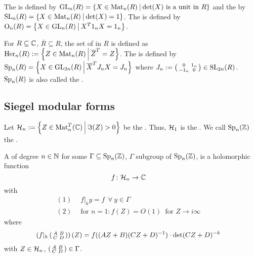 The  is defined by $\GL_n(R) = \Set{X \in \M_n(R)}{\text{$\det(X)$ is a unit in $R$}}$
and the  by $\SL_n(R) = \Set{X \in \M_n(R)}{\det(X) = 1}$. %
The  is defined by $\Orth_n(R) = \Set{X \in \GL_n(R)}{X^T 1_n X = 1_n}$. %

For $R \subseteq \mathbb{C}$, $\overline{R} \subseteq R$, the set of  in $R$ is defined as $\Her_n(R) := \Set{Z \in \M_n(R)}{\overline{Z}^T = Z}$.
The  is defined by $\Sp_n(R) = \Set{X \in \GL_{2n}(R)}{\overline{X}^T J_n X = J_n}$ %
where $J_n := \left( \begin{smallmatrix} 0 & 1_n \\ -1_n & 0 \end{smallmatrix} \right) \in \operatorname{SL}_{2n}(R)$. %
$\operatorname{Sp}_n(R)$ is also called the .

\subsection{Siegel modular forms}

Let $\SiegelHalfPlane_n := \Set{Z \in \M_n^T(\C)}{\Im(Z) > 0}$ be the .
Thus, $\mathcal{H}_1$ is the .
We call $\operatorname{Sp}_n(\mathbb{Z})$ the .


A  of degree $n\in\mathbb{N}$ for some $\Gamma \subseteq \operatorname{Sp}_n(\mathbb{Z})$, $\Gamma$ subgroup of $\operatorname{Sp}_n(\mathbb{Z})$, is a holomorphic function
\[ f \colon \mathcal{H}_n \rightarrow \mathbb{C} \]
with
\begin{align*}
(1) \ \ & f |_k y = f \ \ \forall \ y \in \Gamma \\
(2) \ \ & \text{for } n = 1 \colon f(Z) = O(1) \ \text{ for } Z \rightarrow i \infty
\end{align*}
where
\[ \left( f|_k \left( \begin{smallmatrix} A & B \\ C & D \end{smallmatrix} \right) \right) (Z) =
f((AZ + B)(CZ + D)^{-1}) \cdot \det(CZ + D)^{-k} \]
with $Z \in \mathcal{H}_n$, $\left( \begin{smallmatrix} A & B \\ C & D \end{smallmatrix} \right) \in \Gamma$.

